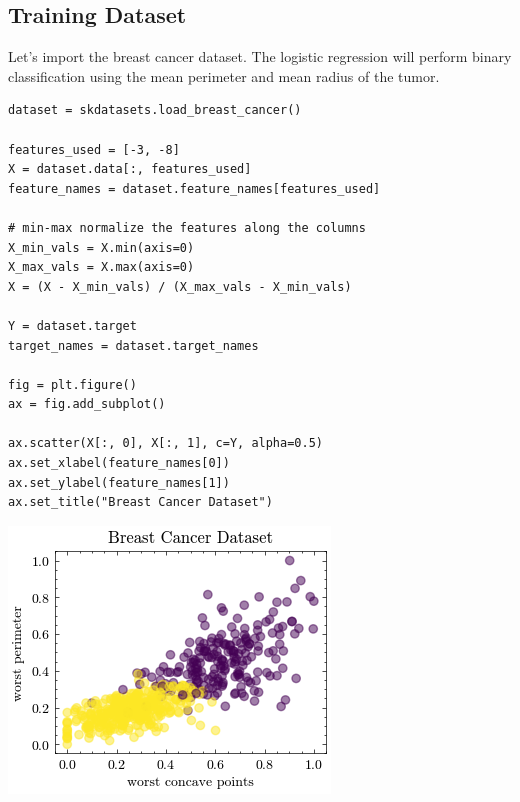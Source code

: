 \documentclass[openany]{book}
\begin{document}
    \subsection{Training Dataset}\label{training-dataset}

Let's import the breast cancer dataset. The logistic regression will
perform binary classification using the mean perimeter and mean radius
of the tumor.

\begin{tcolorbox}
\tiny
\begin{verbatim}
dataset = skdatasets.load_breast_cancer()

features_used = [-3, -8]
X = dataset.data[:, features_used]
feature_names = dataset.feature_names[features_used]

# min-max normalize the features along the columns
X_min_vals = X.min(axis=0)
X_max_vals = X.max(axis=0)
X = (X - X_min_vals) / (X_max_vals - X_min_vals)

Y = dataset.target
target_names = dataset.target_names

fig = plt.figure()
ax = fig.add_subplot()

ax.scatter(X[:, 0], X[:, 1], c=Y, alpha=0.5)
ax.set_xlabel(feature_names[0])
ax.set_ylabel(feature_names[1])
ax.set_title("Breast Cancer Dataset")
\end{verbatim}
\end{tcolorbox}
        
    \begin{center}
    \includegraphics[width=\textwidth]{combined_files/combined_66_1.png}
    \end{center}
    { \hspace*{\fill} \\}
    
\end{document}

